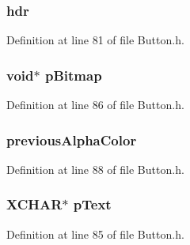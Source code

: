 \subsubsection[{hdr}]{ hdr}\label{struct_b_u_t_t_o_n_abeffaf353197a8a64fba6707b68ce0be}


Definition at line 81 of file Button.\+h.

\hypertarget{struct_b_u_t_t_o_n_aef9bed8e1a29e17226ccbd9a3d81f9e1}{}
\subsubsection[{p\+Bitmap}]{\setlength{\rightskip}{0pt plus 5cm}void$\ast$ p\+Bitmap}\label{struct_b_u_t_t_o_n_aef9bed8e1a29e17226ccbd9a3d81f9e1}


Definition at line 86 of file Button.\+h.

\hypertarget{struct_b_u_t_t_o_n_ae1b76b0df5f37334d126b747ff99b5ca}{}
\subsubsection[{previous\+Alpha\+Color}]{ previous\+Alpha\+Color}\label{struct_b_u_t_t_o_n_ae1b76b0df5f37334d126b747ff99b5ca}


Definition at line 88 of file Button.\+h.

\hypertarget{struct_b_u_t_t_o_n_a934b5563cdaf14803728ff3a7b7e8c7f}{}
\subsubsection[{p\+Text}]{\setlength{\rightskip}{0pt plus 5cm}X\+C\+H\+A\+R$\ast$ p\+Text}\label{struct_b_u_t_t_o_n_a934b5563cdaf14803728ff3a7b7e8c7f}


Definition at line 85 of file Button.\+h.

\hypertarget{struct_b_u_t_t_o_n_ae5bf5300978dec1b6c69ee537e1c98f8}{}
